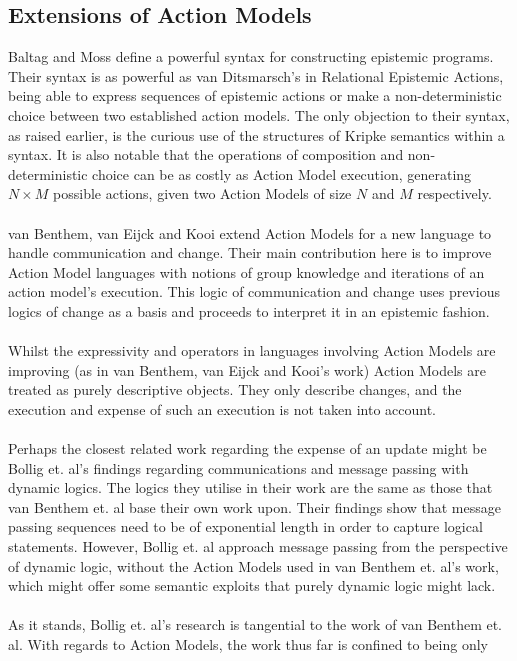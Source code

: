 \documentclass[12pt, a4paper, twoside]{article}
\begin{document}
\subsection{Extensions of Action Models}
Baltag and Moss define a powerful syntax for constructing epistemic programs.
Their syntax is as powerful as van Ditsmarsch's in Relational Epistemic Actions,
being able to express sequences of epistemic actions or make a non-deterministic
choice between two established action models.
The only objection to their syntax, as raised earlier, is the curious use of
the structures of Kripke semantics within a syntax.
It is also notable that the operations of composition and non-deterministic
choice can be as costly as Action Model execution, generating $N \times M$
possible actions, given two Action Models of size $N$ and $M$ respectively.\\
\\
van Benthem, van Eijck and Kooi extend Action Models for a new language to
handle communication and change.
Their main contribution here is to improve Action Model languages with notions
of group knowledge and iterations of an action model's execution.
This logic of communication and change uses previous logics of change as a basis
and proceeds to interpret it in an epistemic fashion.\\
\\
Whilst the expressivity and operators in languages involving Action Models are
improving (as in van Benthem, van Eijck and Kooi's work) Action Models are
treated as purely descriptive objects.
They only describe changes, and the execution and expense of such an execution
is not taken into account.\\
\\
Perhaps the closest related work regarding the expense of an update might be
Bollig et. al's findings regarding communications and message passing with
dynamic logics.
The logics they utilise in their work are the same as those that van Benthem et.
al base their own work upon.
Their findings show that message passing sequences need to be of exponential
length in order to capture logical statements.
However, Bollig et. al approach message passing from the perspective of dynamic
logic, without the Action Models used in van Benthem et. al's work, which might
offer some semantic exploits that purely dynamic logic might lack.\\
\\
As it stands, Bollig et. al's research is tangential to the work of van Benthem
et. al.
With regards to Action Models, the work thus far is confined to being only
\end{document}

